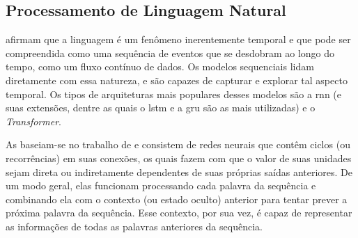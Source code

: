 







\subsection{Processamento de Linguagem Natural}

 afirmam que a linguagem é um fenômeno inerentemente temporal e que pode ser compreendida como uma sequência de eventos que se desdobram ao longo do tempo, como um fluxo contínuo de dados.
Os modelos sequenciais lidam diretamente com essa natureza, e são capazes de capturar e explorar tal aspecto temporal.
Os tipos de arquiteturas mais populares desses modelos são a \acrfull{rnn} (e suas extensões, dentre as quais o \acrfull{lstm} e a \acrfull{gru} são as mais utilizadas) e o \textit{Transformer}.


As  baseiam-se no trabalho de  e consistem de redes neurais que contêm ciclos (ou recorrências) em suas conexões, os quais fazem com que o valor de suas unidades sejam direta ou indiretamente dependentes de suas próprias saídas anteriores.
De um modo geral, elas funcionam processando cada palavra da sequência e combinando ela com o contexto (ou estado oculto) anterior para tentar prever a próxima palavra da sequência. Esse contexto, por sua vez, é capaz de representar as informações de todas as palavras anteriores da sequência.


